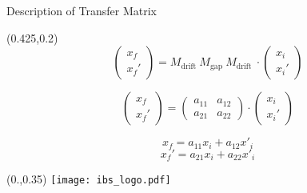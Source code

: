 \documentclass[10pt,aspectratio=169]{beamer}
\begin{document}
\begin{frame}{Description of Transfer Matrix}
    \begin{textblock*}{0.5\paperwidth}(0.425\paperwidth,0.2\paperheight)
        \centering
        \begin{equation*}
            \begin{pmatrix}x_f \\ x_f'\end{pmatrix} = M_\text{drift  } M_\text{gap  } M_\text{drift  } \cdot \begin{pmatrix}x_i \\ x_i'\end{pmatrix}
        \end{equation*}
        
        \begin{equation*}
            \begin{pmatrix}x_f \\ x_f'\end{pmatrix} = \begin{pmatrix} a_{11} & a_{12}\\  a_{21} & a_{22}\end{pmatrix} \cdot \begin{pmatrix}x_i \\ x_i'\end{pmatrix}
        \end{equation*}

        \begin{equation}
            x_f = a_{11} x_i +  a_{12} x'_i  
        \end{equation}
        \begin{equation}
            x_f' = a_{21} x_i +  a_{22} x'_i 
        \end{equation}
            
    \end{textblock*}
    \begin{textblock*}{0.5\paperwidth}(0.\paperwidth,0.35\paperheight)
			\centering
			\texttt{[image: ibs\_logo.pdf]}
		\end{textblock*}
  
\end{frame}
\end{document}
